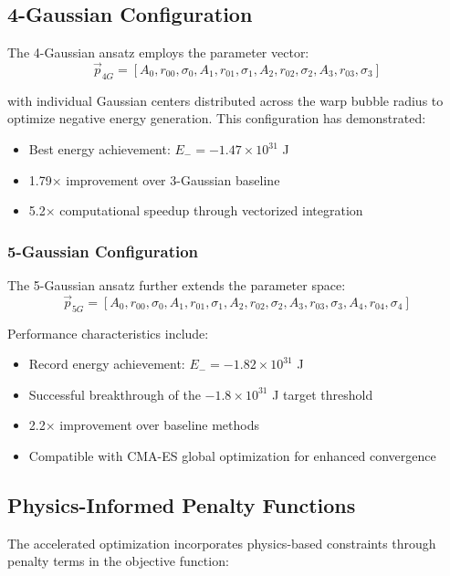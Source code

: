 \documentclass[12pt,a4paper]{article}
\begin{document}
\subsection{4-Gaussian Configuration}

The 4-Gaussian ansatz employs the parameter vector:
\begin{equation}
\vec{p}_{4G} = [A_0, r_{00}, \sigma_0, A_1, r_{01}, \sigma_1, A_2, r_{02}, \sigma_2, A_3, r_{03}, \sigma_3]
\end{equation}

with individual Gaussian centers distributed across the warp bubble radius to optimize negative energy generation. This configuration has demonstrated:
\begin{itemize}
\item Best energy achievement: $E_- = -1.47 \times 10^{31}$ J
\item 1.79× improvement over 3-Gaussian baseline
\item 5.2× computational speedup through vectorized integration
\end{itemize}

\subsubsection{5-Gaussian Configuration}

The 5-Gaussian ansatz further extends the parameter space:
\begin{equation}
\vec{p}_{5G} = [A_0, r_{00}, \sigma_0, A_1, r_{01}, \sigma_1, A_2, r_{02}, \sigma_2, A_3, r_{03}, \sigma_3, A_4, r_{04}, \sigma_4]
\end{equation}

Performance characteristics include:
\begin{itemize}
\item Record energy achievement: $E_- = -1.82 \times 10^{31}$ J  
\item Successful breakthrough of the $-1.8 \times 10^{31}$ J target threshold
\item 2.2× improvement over baseline methods
\item Compatible with CMA-ES global optimization for enhanced convergence
\end{itemize}

\subsection{Physics-Informed Penalty Functions}

The accelerated optimization incorporates physics-based constraints through penalty terms in the objective function:
\end{document}
